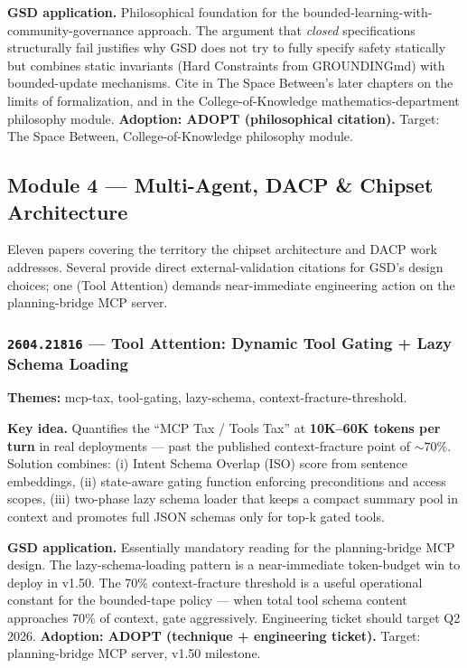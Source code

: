 \documentclass[11pt,letterpaper]{article}
\newcommand{\arxivid}[1]{\texttt{\textcolor{accent}{#1}}}
\newcommand{\paperhead}[2]{\noindent\textbf{\sffamily\textcolor{secondary}{#1}} \textemdash{} #2}
\begin{document}
\textbf{GSD application.} Philosophical foundation for the bounded-learning-with-community-governance approach. The argument that \textit{closed} specifications structurally fail justifies why GSD does not try to fully specify safety statically but combines static invariants (Hard Constraints from GROUNDINGmd) with bounded-update mechanisms. Cite in The Space Between's later chapters on the limits of formalization, and in the College-of-Knowledge mathematics-department philosophy module. \textbf{Adoption: ADOPT (philosophical citation).} Target: The Space Between, College-of-Knowledge philosophy module.

\subsection{Module 4 --- Multi-Agent, DACP \& Chipset Architecture}

Eleven papers covering the territory the chipset architecture and DACP work addresses. Several provide direct external-validation citations for GSD's design choices; one (Tool Attention) demands near-immediate engineering action on the planning-bridge MCP server.

\subsubsection{\arxivid{2604.21816} --- Tool Attention: Dynamic Tool Gating + Lazy Schema Loading}

\paperhead{Themes:}{mcp-tax, tool-gating, lazy-schema, context-fracture-threshold.}

\textbf{Key idea.} Quantifies the ``MCP Tax / Tools Tax'' at \textbf{10K--60K tokens per turn} in real deployments --- past the published context-fracture point of ${\sim}70\%$. Solution combines: (i) Intent Schema Overlap (ISO) score from sentence embeddings, (ii) state-aware gating function enforcing preconditions and access scopes, (iii) two-phase lazy schema loader that keeps a compact summary pool in context and promotes full JSON schemas only for top-k gated tools.

\textbf{GSD application.} Essentially mandatory reading for the planning-bridge MCP design. The lazy-schema-loading pattern is a near-immediate token-budget win to deploy in v1.50. The 70\% context-fracture threshold is a useful operational constant for the bounded-tape policy --- when total tool schema content approaches 70\% of context, gate aggressively. Engineering ticket should target Q2 2026. \textbf{Adoption: ADOPT (technique + engineering ticket).} Target: planning-bridge MCP server, v1.50 milestone.
\end{document}
